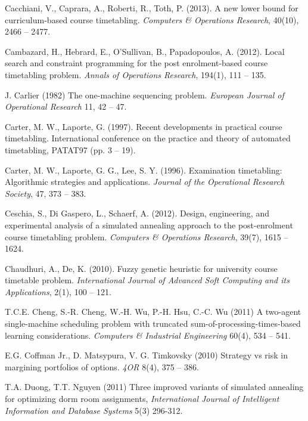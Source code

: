 \documentclass[11pt]{article}
\begin{document}
\begin{thebibliography}{19}
Cacchiani, V., Caprara, A., Roberti, R., Toth, P. (2013). 
A new lower bound for curriculum-based course timetabling. 
\textit{Computers \& Operations Research}, 40(10), 2466 -- 2477.


Cambazard, H., Hebrard, E., O'Sullivan, B., Papadopoulos, A. (2012). 
Local search and constraint programming for the post enrolment-based course timetabling problem. 
\textit{Annals of Operations Research}, 194(1), 111 -- 135.

J. Carlier (1982) 
The one-machine sequencing problem. 
\textit{European Journal of Operational Research} 11, 42 -- 47.

Carter, M. W., Laporte, G. (1997). 
Recent developments in practical course timetabling. 
International conference on the practice and theory of automated timetabling, PATAT97 (pp. 3 -- 19).

Carter, M. W., Laporte, G. G., Lee, S. Y. (1996). 
Examination timetabling: Algorithmic strategies and applications. 
\textit{Journal of the Operational Research Society}, 47, 373 -- 383.

Ceschia, S., Di Gaspero, L., Schaerf, A. (2012). 
Design, engineering, and experimental analysis of a simulated annealing approach to the post-enrolment course timetabling problem. 
\textit{Computers \& Operations Research}, 39(7), 1615 -- 1624.

Chaudhuri, A., De, K. (2010). 
Fuzzy genetic heuristic for university course timetable problem. 
\textit{International Journal of Advanced Soft Computing and its Applications}, 2(1), 100 -- 121. 

T.C.E. Cheng, S.-R. Cheng, W.-H. Wu, P.-H. Hsu, C.-C. Wu (2011) 
A two-agent single-machine scheduling problem with truncated sum-of-processing-times-based learning considerations. 
\textit{Computers \& Industrial Engineering} 60(4), 534 -- 541.

E.G. Coffman Jr., D. Matsypura, V. G. Timkovsky (2010) 
Strategy vs risk in margining portfolios of options. 
\textit{4OR} 8(4), 375 -- 386.

T.A. Duong, T.T. Nguyen (2011) 
Three improved variants of simulated annealing for optimizing dorm room assignments, 
\textit{International Journal of Intelligent Information and Database Systems} 5(3) 296-312.


\end{thebibliography}
\end{document}
